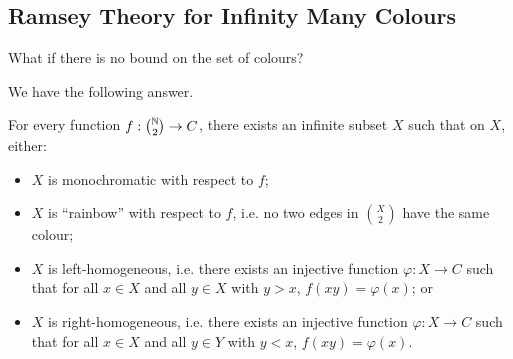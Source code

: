 \documentclass[main.tex]{subfiles}
\begin{document}
\subsection{Ramsey Theory for Infinity Many Colours}
\begin{question*}
  What if there is no bound on the set of colours?
\end{question*}
We have the following answer.
\begin{theorem}
  For every function
  $f:\binom{\mathbb N}{2}\to C$, there exists an infinite subset $X$ such that on
  $X$, either:
  \begin{itemize}
    \item $X$ is monochromatic with respect to $f$;

    \item $X$ is ``rainbow'' with respect to $f$, i.e. no two edges in
      $\binom X 2$ have the same colour;

    \item $X$ is left-homogeneous, i.e. there exists an injective function
      $\varphi:X\to C$ such that for all $x\in X$ and all $y\in X$ with $y > x$,
      $f(xy) = \varphi(x)$; or

    \item $X$ is right-homogeneous, i.e. there exists an injective function
      $\varphi:X\to C$ such that for all $x\in X$ and all $y\in Y$ with $y < x$,
      $f(xy) = \varphi(x)$.
  \end{itemize}
\end{theorem}
\end{document}
